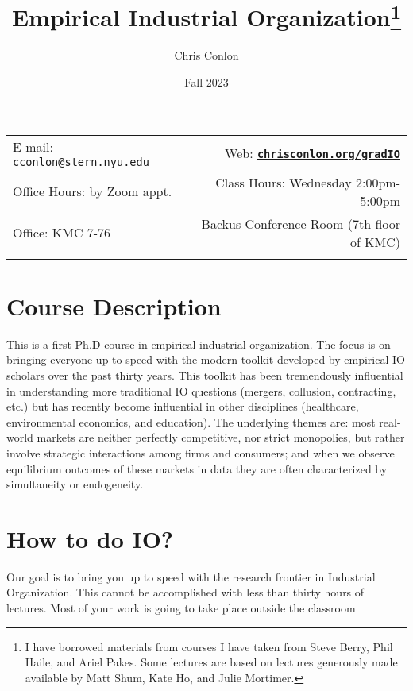 \documentclass[11pt]{article}
\title{Empirical Industrial Organization\footnote{I have borrowed materials from courses I have taken from Steve Berry, Phil Haile, and Ariel Pakes. Some lectures are based on lectures generously made available by Matt Shum, Kate Ho, and Julie Mortimer.}}
\author{Chris Conlon}
\date{Fall 2023}
\newcommand{\blankline}{\quad\pagebreak[2]}
\begin{document}
\maketitle

\blankline

\begin{tabular*}{.93\textwidth}{@{\extracolsep{\fill}}lr}


  E-mail: \texttt{cconlon@stern.nyu.edu} & Web: \href{http://chrisconlon.org}{\tt\bf chrisconlon.org/gradIO}  \\

 Office Hours: by Zoom appt. &  Class Hours: Wednesday 2:00pm-5:00pm \\


 Office: KMC 7-76  & Backus Conference Room (7th floor of KMC) \\
&  \\
\hline
\end{tabular*}

\vspace{10 mm}

\section*{Course Description}
This is a first Ph.D course in empirical industrial organization. The focus is on bringing everyone up to speed with the modern toolkit developed by empirical IO scholars over the past thirty years. This toolkit has been tremendously influential in understanding more traditional IO questions (mergers, collusion, contracting, etc.) but has recently become influential in other disciplines (healthcare, environmental economics, and education). The underlying themes are: most real-world markets are neither perfectly competitive, nor strict monopolies, but rather involve strategic interactions among firms and consumers; and when we observe equilibrium outcomes of these markets in data they are often characterized by simultaneity or endogeneity.


\section*{How to do IO?}
Our goal is to bring you up to speed with the research frontier in Industrial Organization. This cannot be accomplished with less than thirty hours of lectures. Most of your work is going to take place outside the classroom
\end{document}
